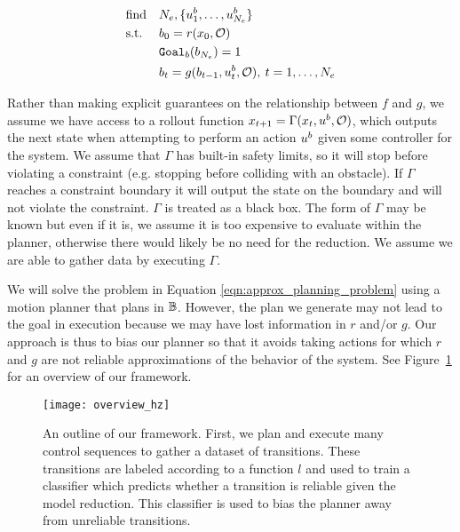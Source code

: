 \begin{equation}
    \begin{aligned}
        & \text{find}   & & N_e, \{u^b_1, \dots, u^b_{N_e} \} \\
        & \text{s.t.}   & & b_0 = r(x_0,\mathcal{O}) \\
        &               & &  \texttt{Goal}_b(b_{N_e}) = 1\\
        &               & & b_{t} = g(b_{t-1},u^b_t,\mathcal{O}), \:  t = 1, \dots, N_e \\
    \end{aligned}
    \label{eqn:approx_planning_problem}
\end{equation}

Rather than making explicit guarantees on the relationship between $f$ and $g$, we assume we have access to a rollout function $x_{t+1} = \Gamma(x_t,u^b,\mathcal{O})$, which outputs the next state when attempting to perform an action $u^b$ given some controller for the system. We assume that $\Gamma$ has built-in safety limits, so it will stop before violating a constraint (e.g. stopping before colliding with an obstacle). If $\Gamma$ reaches a constraint boundary it will output the state on the boundary and will not violate the constraint. $\Gamma$ is treated as a black box. The form of $\Gamma$ may be known but even if it is, we assume it is too expensive to evaluate within the planner, otherwise there would likely be no need for the reduction. We assume we are able to gather data by executing $\Gamma$.

We will solve the problem in Equation \ref{eqn:approx_planning_problem} using a motion planner that plans in $\mathbb{B}$. However, the plan we generate may not lead to the goal in execution because we may have lost information in $r$ and/or $g$. Our approach is thus to bias our planner so that it avoids taking actions for which $r$ and $g$ are not reliable approximations of the behavior of the system. See Figure~\ref{fig:overview} for an overview of our framework.

\begin{figure}[h]
    \centering
    \texttt{[image: overview\_hz]}
    \caption{An outline of our framework. First, we plan and execute many control sequences to gather a dataset of transitions. These transitions are labeled according to a function $l$ and used to train a classifier which predicts whether a transition is reliable given the model reduction. This classifier is used to bias the planner away from unreliable transitions.}
    \label{fig:overview}
\end{figure}

